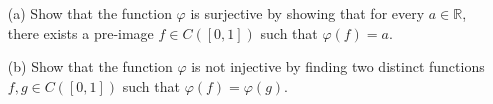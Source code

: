 \documentclass[10pt]{report}
\begin{document}
\begin{itemize}

\item[(a)]  Show that the function $\varphi$ is surjective by showing that for every $a \in \mathbb R$, there exists a pre-image $f \in C([0,1])$ such that $\varphi (f) = a$.  

\item[(b)]  Show that the function $\varphi$ is not injective by finding two distinct functions $f,g \in C([0,1])$ such that $\varphi(f) = \varphi(g)$.

\end{itemize}
\end{document}
